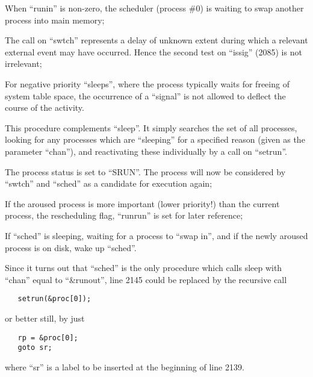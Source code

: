 \item[2080:] When ``runin'' is non-zero, the
 scheduler (process \#0) is waiting
 to swap another process into main
 memory;

\item[2084:] The call on ``swtch'' represents a
 delay of unknown extent during
 which a relevant external event
 may have occurred. Hence the
 second test on ``issig'' (2085) is
 not irrelevant;

\item[2087:] For negative priority ``sleeps'',
 where the process typically waits
 for freeing of system table
 space, the occurrence of a ``signal'' is not allowed to deflect
 the course of the activity.
\ed



This procedure complements ``sleep''. It
simply searches the set of all
processes, looking for any processes
which are ``sleeping'' for a specified
reason (given as the parameter ``chan''),
and reactivating these individually by
a call on ``setrun''.


\bd
\item[2140:] The process status is set to
 ``SRUN''. The process will now be
 considered by ``swtch'' and ``sched''
 as a candidate for execution
 again;

\item[2141:] If the aroused process is more
important (lower priority!) than
the current process, the
rescheduling flag, ``runrun'' is
set for later reference;

\item[2143:] If ``sched'' is sleeping, waiting
for a process to ``swap in'', and
if the newly aroused process is
on disk, wake up ``sched''.
\ed

Since it turns out that ``sched'' is the
only procedure which calls sleep with
``chan'' equal to ``\&runout'', line 2145
could be replaced by the recursive call

\begin{verbatim}
   setrun(&proc[0]);
\end{verbatim}

\noindent or better still, by just

\begin{verbatim}
   rp = &proc[0];
   goto sr;
\end{verbatim}

\noindent where ``sr'' is a label to be inserted at
the beginning of line 2139.

